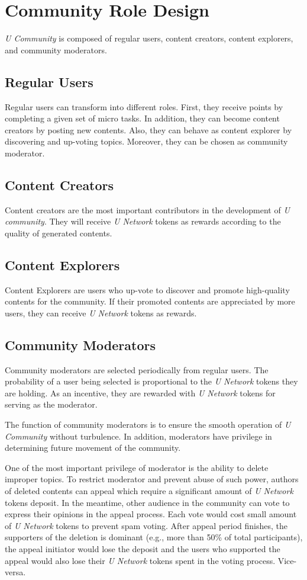 \section{Community Role Design}
\emph{U Community} is composed of regular users, content creators, content explorers, and community moderators. 
\subsection{Regular Users}
Regular users can transform into different roles. First, they receive points by completing a given set of micro tasks. In addition, they can become content creators by posting new contents. Also, they can behave as content explorer by discovering and up-voting topics. Moreover, they can be chosen as community moderator.  
\subsection{Content Creators}
Content creators are the most important contributors in the development of \emph{U community}. They will receive \emph{U Network} tokens as rewards according to the quality of generated contents. 
\subsection{Content Explorers}
Content Explorers are users who up-vote to discover and promote high-quality contents for the community. If their promoted contents are appreciated by more users, they can receive \emph{U Network} tokens as rewards. 
\subsection{Community Moderators}
Community moderators are selected periodically from regular users. The probability of a user being selected is proportional to the \emph{U Network} tokens they are holding. As an incentive, they are rewarded with \emph{U Network} tokens for serving as the moderator.

The function of community moderators is to ensure the smooth operation of \emph{U Community} without turbulence. In addition, moderators have privilege in determining future movement of the community. 

One of the most important privilege of moderator is the ability to delete improper topics. To restrict moderator and prevent abuse of such power, authors of deleted contents can appeal which require a significant amount of \emph{U Network} tokens deposit. In the meantime, other  audience in the community can vote to express their opinions in the appeal process. Each vote would cost small amount of \emph{U Network} tokens to prevent spam voting. After appeal period finishes, the supporters of the deletion is dominant (e.g., more than 50\% of total participants), the appeal initiator would lose the deposit and the users who supported the appeal would also lose their \emph{U Network} tokens spent in the voting process. Vice-versa. 

